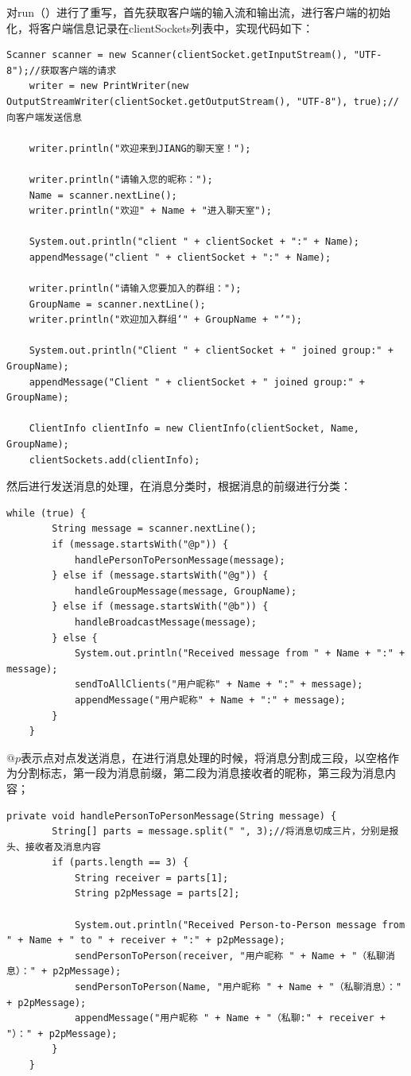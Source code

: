 \documentclass[UTF8,12pt]{article}
\begin{document}
对run（）进行了重写，首先获取客户端的输入流和输出流，进行客户端的初始化，将客户端信息记录在clientSockets列表中，实现代码如下：
\begin{lstlisting}[title=获取输入输出流及初始化,frame=shadowbox]
    Scanner scanner = new Scanner(clientSocket.getInputStream(), "UTF-8");//获取客户端的请求
    writer = new PrintWriter(new OutputStreamWriter(clientSocket.getOutputStream(), "UTF-8"), true);//向客户端发送信息

    writer.println("欢迎来到JIANG的聊天室！");

    writer.println("请输入您的昵称：");
    Name = scanner.nextLine();
    writer.println("欢迎" + Name + "进入聊天室");

    System.out.println("client " + clientSocket + ":" + Name);
    appendMessage("client " + clientSocket + ":" + Name);

    writer.println("请输入您要加入的群组：");
    GroupName = scanner.nextLine();
    writer.println("欢迎加入群组‘" + GroupName + "’");

    System.out.println("Client " + clientSocket + " joined group:" + GroupName);
    appendMessage("Client " + clientSocket + " joined group:" + GroupName);

    ClientInfo clientInfo = new ClientInfo(clientSocket, Name, GroupName);
    clientSockets.add(clientInfo);
\end{lstlisting}

然后进行发送消息的处理，在消息分类时，根据消息的前缀进行分类：
\begin{lstlisting}[title=消息分类,frame=shadowbox]
    while (true) {
        String message = scanner.nextLine();
        if (message.startsWith("@p")) {
            handlePersonToPersonMessage(message);
        } else if (message.startsWith("@g")) {
            handleGroupMessage(message, GroupName);
        } else if (message.startsWith("@b")) {
            handleBroadcastMessage(message);
        } else {
            System.out.println("Received message from " + Name + ":" + message);
            sendToAllClients("用户昵称" + Name + ":" + message);
            appendMessage("用户昵称" + Name + ":" + message);
        }
    }
\end{lstlisting}

$@p$表示点对点发送消息，在进行消息处理的时候，将消息分割成三段，以空格作为分割标志，第一段为消息前缀，第二段为消息接收者的昵称，第三段为消息内容；
\begin{lstlisting}[title=处理点对点消息,frame=shadowbox]
    private void handlePersonToPersonMessage(String message) {
        String[] parts = message.split(" ", 3);//将消息切成三片，分别是报头、接收者及消息内容
        if (parts.length == 3) {
            String receiver = parts[1];
            String p2pMessage = parts[2];

            System.out.println("Received Person-to-Person message from " + Name + " to " + receiver + ":" + p2pMessage);
            sendPersonToPerson(receiver, "用户昵称 " + Name + "（私聊消息）：" + p2pMessage);
            sendPersonToPerson(Name, "用户昵称 " + Name + "（私聊消息）：" + p2pMessage);
            appendMessage("用户昵称 " + Name + "（私聊:" + receiver + "）：" + p2pMessage);
        }
    }
\end{lstlisting}
\end{document}
